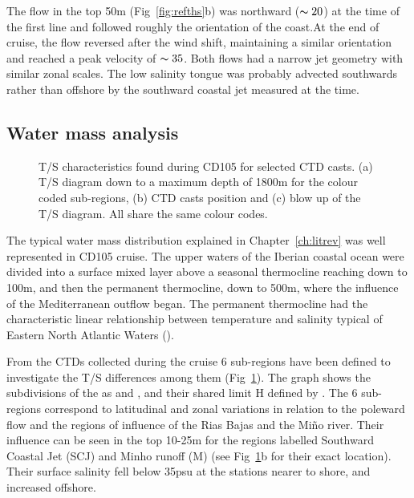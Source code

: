 The flow in the top 50m (Fig~\ref{fig:refths}b) was northward
($\thicksim 20$\velc) at the time of the first line and followed
roughly the orientation of the coast.At the end of cruise, the
flow reversed after the wind shift, maintaining a similar
orientation and reached a peak velocity of $\thicksim 35$\velc.
Both flows had a narrow jet geometry with similar zonal scales.
The low salinity tongue was probably advected southwards rather
than offshore by the southward coastal jet measured at the time.

\subsection{Water mass analysis}
\begin{figure}[t]
\centering \begin{minipage}{7cm} %
\end{minipage}
\begin{minipage}{4cm}
 
\end{minipage}\caption{T/S characteristics found during CD105 for
selected CTD casts. (a) T/S diagram down to a maximum depth of
1800m for the colour coded sub-regions, (b) CTD casts position and
(c) blow up of the T/S diagram. All share the same colour codes. }
\label{fig:cd105ts}\end{figure}

The typical water mass distribution explained in
Chapter~\ref{ch:litrev} was well represented in CD105 cruise. The
upper waters of the Iberian coastal ocean were divided into a
surface mixed layer above a seasonal thermocline reaching down to
100m, and then the permanent thermocline, down to 500m, where the
influence of the Mediterranean outflow began. The permanent
thermocline had the characteristic linear relationship between
temperature and salinity typical of Eastern North Atlantic Waters
(\enaw).

From the CTDs collected during the cruise 6 sub-regions have been
defined to investigate the T/S differences among them
(Fig~\ref{fig:cd105ts}). The graph shows the subdivisions of the
\enaw as \enawt and \enawp, and their shared limit H defined by
\citet{Rios92}. The 6 sub-regions correspond to latitudinal and
zonal variations in relation to the poleward flow and the regions
of influence of the Rias Bajas and the Mi\~no river. Their
influence can be seen in the top 10-25m for the regions labelled
Southward Coastal Jet (SCJ) and Minho runoff (M) (see
Fig~\ref{fig:cd105ts}b for their exact location). Their surface
salinity fell below 35psu at the stations nearer to shore, and
increased offshore.

